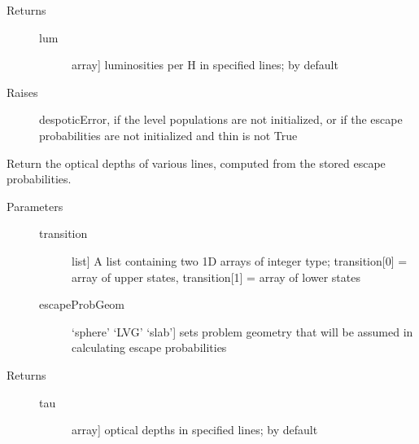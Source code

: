 \documentclass[letterpaper,10pt,english]{sphinxmanual}
\begin{document}
\begin{fulllineitems}
\begin{fulllineitems}
\begin{description}
\begin{description}
\end{description}

\item[{Returns}] \leavevmode\begin{description}
\item[{lum}] \leavevmode{[}array{]}
luminosities per H in specified lines; by default

\end{description}

\item[{Raises}] \leavevmode
despoticError, if the level populations are not initialized,
or if the escape probabilities are not initialized and thin is
not True

\end{description}

\end{fulllineitems}


\begin{fulllineitems}
\label{fulldoc:despotic.emitter.opticalDepth}
Return the optical depths of various lines, computed from the
stored escape probabilities.
\begin{description}
\item[{Parameters}] \leavevmode\begin{description}
\item[{transition}] \leavevmode{[}list{]}
A list containing two 1D arrays of integer type;
transition{[}0{]} = array of upper states, transition{[}1{]} =
array of lower states

\item[{escapeProbGeom}] \leavevmode{[}`sphere' \textbar{} `LVG' \textbar{} `slab'{]}
sets problem geometry that will be assumed in calculating
escape probabilities

\end{description}

\item[{Returns}] \leavevmode\begin{description}
\item[{tau}] \leavevmode{[}array{]}
optical depths in specified lines; by default

\end{description}

\end{description}


\end{fulllineitems}
\end{fulllineitems}
\end{document}
